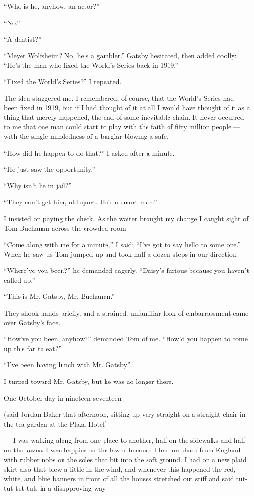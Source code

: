 \documentclass{znotebook}
\begin{document}
``Who is he, anyhow, an actor?''

``No.''

``A dentist?''

``Meyer Wolfsheim? No, he’s a gambler.'' Gatsby hesitated, then added coolly: ``He’s the man who fixed the World’s Series back in 1919.''

``Fixed the World’s Series?'' I repeated.

The idea staggered me. I remembered, of course, that the World’s Series had been fixed in 1919, but if I had thought of it at all I would have thought of it as a thing that merely happened, the end of some inevitable chain. It never occurred to me that one man could start to play with the faith of fifty million people — with the single-mindedness of a burglar blowing a safe.

``How did he happen to do that?'' I asked after a minute.

``He just saw the opportunity.''

``Why isn’t he in jail?''

``They can’t get him, old sport. He’s a smart man.''

I insisted on paying the check. As the waiter brought my change I caught sight of Tom Buchanan across the crowded room.

``Come along with me for a minute,'' I said; ``I’ve got to say hello to some one.'' When he saw us Tom jumped up and took half a dozen steps in our direction.

``Where’ve you been?'' he demanded eagerly. ``Daisy’s furious because you haven’t called up.''

``This is Mr. Gatsby, Mr. Buchanan.''

They shook hands briefly, and a strained, unfamiliar look of embarrassment came over Gatsby’s face.

``How’ve you been, anyhow?'' demanded Tom of me. ``How’d you happen to come up this far to eat?''

``I’ve been having lunch with Mr. Gatsby.''

I turned toward Mr. Gatsby, but he was no longer there.

One October day in nineteen-seventeen ——

(said Jordan Baker that afternoon, sitting up very straight on a straight chair in the tea-garden at the Plaza Hotel)

— I was walking along from one place to another, half on the sidewalks and half on the lawns. I was happier on the lawns because I had on shoes from England with rubber nobs on the soles that bit into the soft ground. I had on a new plaid skirt also that blew a little in the wind, and whenever this happened the red, white, and blue banners in front of all the houses stretched out stiff and said tut-tut-tut-tut, in a disapproving way.
\end{document}
